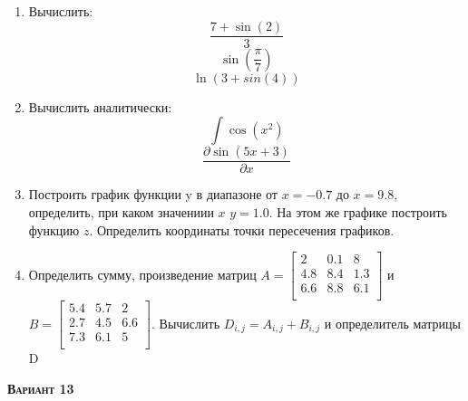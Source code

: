 \begin{enumerate}
\item Вычислить: 
\begin{equation*}\dfrac{7+\sin(2)}{3}              \end{equation*}
\begin{equation*}\sin \left( \dfrac{\pi}{7} \right)\end{equation*}
\begin{equation*}\ln(3+sin(4))                     \end{equation*}

\item Вычислить аналитически: 
 \begin{equation*} \int \cos(x^2)          \end{equation*}\begin{equation*} {\dfrac{\partial \sin(5 x +3)}{\partial x}} \end{equation*}
\item Построить график функции y в диапазоне от $x=-0.7$ до $x=9.8$, определить, при каком значениии $x$ $y=1.0$. На этом же графике построить функцию $z $. Определить координаты точки пересечения графиков. \item Определить сумму, произведение матриц $A=\begin{bmatrix}
2 &0.1 &8 \\
4.8 &8.4 &1.3 \\
6.6 &8.8 &6.1 \\
\end{bmatrix}
$ и $B=\begin{bmatrix}
5.4 &5.7 &2 \\
2.7 &4.5 &6.6 \\
7.3 &6.1 &5 \\
\end{bmatrix}
$. Вычислить $D_{i,j}=A_{i,j} + B_{i,j}$ и определитель матрицы D
\end{enumerate}
\textsc{\textbf{Вариант 13}}

